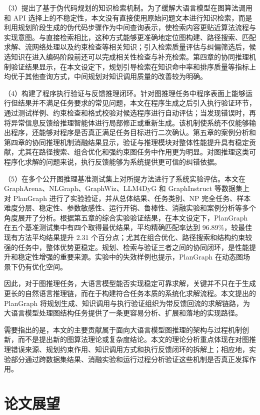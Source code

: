 （3）提出了基于伪代码规划的知识检索机制。为了缓解大语言模型在图算法调用和 API 选择上的不稳定性，本文没有直接使用原始问题文本进行知识检索，而是利用规划阶段生成的伪代码步骤作为中间查询表示，使检索内容更贴近算法流程与实现意图。与直接检索相比，这种方式能够更准确地定位图构建、路径搜索、匹配求解、流网络处理以及约束检查等相关知识；引入检索质量评估与纠偏筛选后，候选知识在进入编码阶段前还可以完成相关性检查与补充检索。第四章的协同推理机制验证结果显示，在本文设定下，规划引导检索在知识命中率和排序质量等指标上均优于其他查询方式，中间规划对知识调用质量的改善较为明确。

（4）构建了程序执行验证与反馈推理闭环。针对图推理任务中程序表面上能够运行但结果并不满足任务要求的常见问题，本文在程序生成之后引入执行验证环节，通过测试样例、约束检查和格式校验对候选程序进行自动评估；当发现错误时，再将异常信息反馈给推理智能体进行局部修正或重新生成。该机制使系统不仅能够输出程序，还能够对程序是否真正满足任务目标进行二次确认。第五章的案例分析和第四章的协同推理机制消融结果显示，验证与推理模块对整体性能提升具有稳定贡献，尤其在路径搜索、组合优化和强约束图任务中作用更为明显。对图推理这类可程序化求解的问题来说，执行反馈能够为系统提供更可信的纠错依据。

（5）在多个公开图推理基准测试集上对所提方法进行了系统实验评估。本文在 GraphArena、NLGraph、GraphWiz、LLM4DyG 和 GraphInstruct 等数据集上对 PlanGraph 进行了实验验证，并从总体结果、任务类别、NP 完全任务、样本难度分层、稳定性、参数敏感性、运行开销、鲁棒性、消融实验和案例分析等多个角度展开了分析。根据第五章的综合实验验证结果，在本文设定下，PlanGraph 在五个基准测试集中有四个取得最优结果，平均精确匹配率达到 96.89\%，较最佳现有方法平均结果提升 2.31 个百分点；尤其在组合优化、路径搜索和结构约束较强的任务中，整体优势更稳定。规划、检索与验证三者之间的协同闭环，是性能提升和稳定性增强的重要来源。实验中的失效样例也提示，PlanGraph 在动态图场景下仍有优化空间。

因此，对于图推理任务，大语言模型能否实现稳定可靠求解，关键并不只在于生成更长的自然语言推理链，而在于构建符合任务本质的系统化求解流程。本文提出的 PlanGraph 将规划生成、知识调用与执行验证组织为带反馈回流的求解链路，为大语言模型处理图结构任务提供了一条更容易分析、扩展和落地的实现路径。

需要指出的是，本文的主要贡献属于面向大语言模型图推理的架构与过程机制创新，而不是提出新的图算法理论或复杂度结论。本文的理论分析重点体现在对图推理错误来源、规划约束作用、知识调用方式和执行反馈闭环的拆解上；相应地，实验部分通过跨数据集结果、消融实验和运行过程分析验证这些机制是否真正发挥作用。

\section{论文展望}

